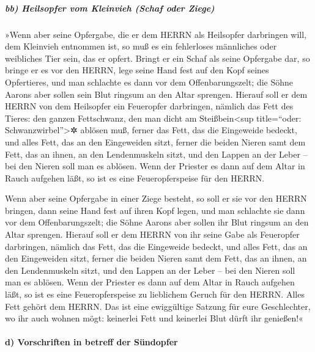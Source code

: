 \hypertarget{bb-heilsopfer-vom-kleinvieh-schaf-oder-ziege}{%
\subparagraph{bb) Heilsopfer vom Kleinvieh (Schaf oder
Ziege)}\label{bb-heilsopfer-vom-kleinvieh-schaf-oder-ziege}}

»Wenn aber seine Opfergabe, die er dem HERRN als
Heilsopfer darbringen will, dem Kleinvieh entnommen ist, so muß es ein
fehlerloses männliches oder weibliches Tier sein, das er opfert.
Bringt er ein Schaf als seine Opfergabe dar, so bringe er
es vor den HERRN, lege seine Hand fest auf den Kopf seines
Opfertieres, und man schlachte es dann vor dem Offenbarungszelt; die
Söhne Aarons aber sollen sein Blut ringsum an den Altar sprengen.
Hierauf soll er dem HERRN von dem Heilsopfer ein
Feueropfer darbringen, nämlich das Fett des Tieres: den ganzen
Fettschwanz, den man dicht am Steißbein\textless sup title=``oder:
Schwanzwirbel''\textgreater✲ ablösen muß, ferner das Fett, das die
Eingeweide bedeckt, und alles Fett, das an den Eingeweiden sitzt,
ferner die beiden Nieren samt dem Fett, das an ihnen, an
den Lendenmuskeln sitzt, und den Lappen an der Leber -- bei den Nieren
soll man es ablösen. Wenn der Priester es dann auf dem
Altar in Rauch aufgehen läßt, so ist es eine Feueropferspeise für den
HERRN.

Wenn aber seine Opfergabe in einer Ziege besteht, so soll
er sie vor den HERRN bringen, dann seine Hand fest auf
ihren Kopf legen, und man schlachte sie dann vor dem Offenbarungszelt;
die Söhne Aarons aber sollen ihr Blut ringsum an den Altar sprengen.
Hierauf soll er dem HERRN von ihr seine Gabe als
Feueropfer darbringen, nämlich das Fett, das die Eingeweide bedeckt, und
alles Fett, das an den Eingeweiden sitzt, ferner die
beiden Nieren samt dem Fett, das an ihnen, an den Lendenmuskeln sitzt,
und den Lappen an der Leber -- bei den Nieren soll man es ablösen.
Wenn der Priester es dann auf dem Altar in Rauch aufgehen
läßt, so ist es eine Feueropferspeise zu lieblichem Geruch für den
HERRN. Alles Fett gehört dem HERRN. Das ist eine
ewiggültige Satzung für eure Geschlechter, wo ihr auch wohnen mögt:
keinerlei Fett und keinerlei Blut dürft ihr genießen!«

\hypertarget{d-vorschriften-in-betreff-der-suxfcndopfer}{%
\paragraph{d) Vorschriften in betreff der
Sündopfer}\label{d-vorschriften-in-betreff-der-suxfcndopfer}}

